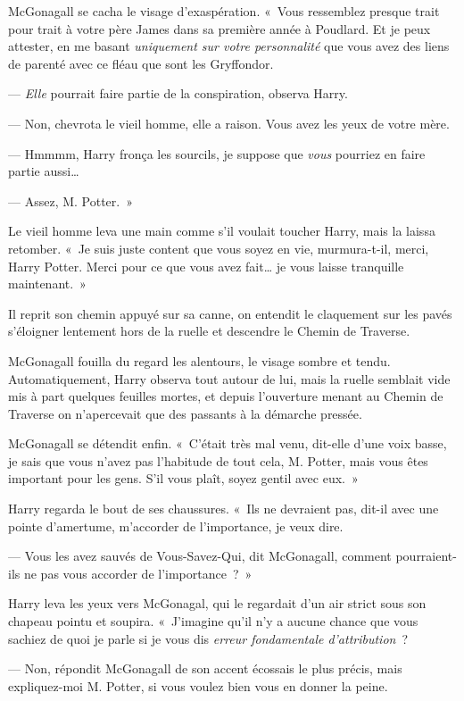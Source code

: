 McGonagall se cacha le visage d'exaspération. «~Vous ressemblez presque trait pour trait à votre père James dans sa première année à Poudlard. Et je peux attester, en me basant \emph{uniquement sur votre personnalité} que vous avez des liens de parenté avec ce fléau que sont les Gryffondor.

--- \emph{Elle} pourrait faire partie de la conspiration, observa Harry.

--- Non, chevrota le vieil homme, elle a raison. Vous avez les yeux de votre mère.

--- Hmmmm, Harry fronça les sourcils, je suppose que \emph{vous} pourriez en faire partie aussi…

--- Assez, M. Potter.~»

Le vieil homme leva une main comme s'il voulait toucher Harry, mais la laissa retomber. «~Je suis juste content que vous soyez en vie, murmura-t-il, merci, Harry Potter. Merci pour ce que vous avez fait… je vous laisse tranquille maintenant.~»

Il reprit son chemin appuyé sur sa canne, on entendit le claquement sur les pavés s'éloigner lentement hors de la ruelle et descendre le Chemin de Traverse.

McGonagall fouilla du regard les alentours, le visage sombre et tendu.  Automatiquement, Harry observa tout autour de lui, mais la ruelle semblait vide mis à part quelques feuilles mortes, et depuis l'ouverture menant au Chemin de Traverse on n'apercevait que des passants à la démarche pressée.

McGonagall se détendit enfin. «~C'était très mal venu, dit-elle d'une voix basse, je sais que vous n'avez pas l'habitude de tout cela, M.  Potter, mais vous êtes important pour les gens. S'il vous plaît, soyez gentil avec eux.~»

Harry regarda le bout de ses chaussures. «~Ils ne devraient pas, dit-il avec une pointe d'amertume, m'accorder de l'importance, je veux dire.

--- Vous les avez sauvés de Vous-Savez-Qui, dit McGonagall, comment pourraient-ils ne pas vous accorder de l'importance~?~»

Harry leva les yeux vers McGonagal, qui le regardait d'un air strict sous son chapeau pointu et soupira.  «~J'imagine qu'il n'y a aucune chance que vous sachiez de quoi je parle si je vous dis \emph{erreur fondamentale d'attribution}~?

--- Non, répondit McGonagall de son accent écossais le plus précis, mais expliquez-moi M. Potter, si vous voulez bien vous en donner la peine.

